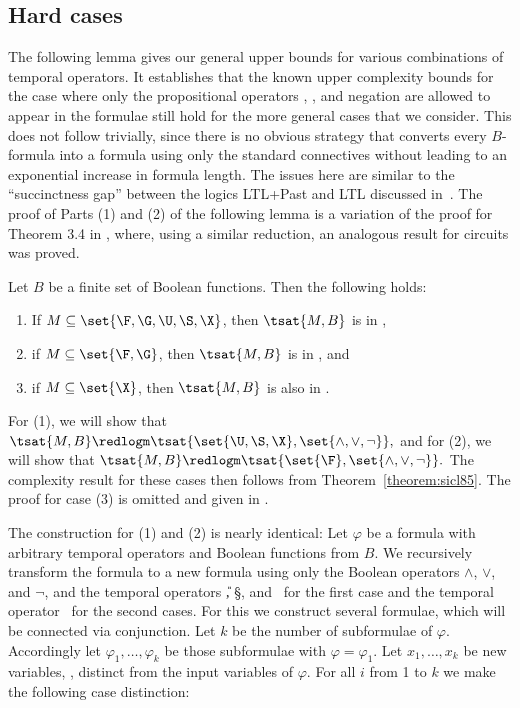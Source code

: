 \subsection{Hard cases}

  The following lemma gives our general upper bounds for various combinations of temporal operators.
It establishes that the known upper complexity bounds for the case
  where only the propositional operators \AND, \OR, and negation are
  allowed to appear in the formulae still hold for the more general
  cases that we consider. This does not follow trivially, since there
  is no obvious strategy that converts every $B$-formula into a
  formula using only the standard connectives without leading to an
  exponential increase in formula length. The issues here are similar
  to the ``succinctness gap'' between the logics LTL+Past and LTL
  discussed in~\cite{mar04}. The proof of Parts (1) and (2) of the
  following lemma is a variation of the proof for Theorem 3.4 in
  \cite{bhss06}, where, using a similar reduction, an analogous result
  for circuits was proved.



  \begin{lemma}\label{lemma:PSPACE_ub_all}
  Let $B$ be a finite set of Boolean functions. Then the following holds:
  \begin{enumerate}[\em(1)]
   \item If $M \subseteq \set{\F,\G,\U,\S,\X}$, then $\tsat{M,B}$ is in \PSPACE,
   \item if $M \subseteq \set{\F,\G}$, then $\tsat{M,B}$ is in \NP, and
   \item if $M \subseteq \set{\X}$, then $\tsat{M,B}$ is also in \NP.
  \end{enumerate}
  \end{lemma}

  \proof For (1), we will show that $\tsat{M,B} \redlogm \tsat{\set{\U,\S,\X},\set{\wedge,\vee,\neg}},$ and
    for (2), we will show that $\tsat{M,B} \redlogm \tsat{\set{\F},\set{\wedge,\vee,\neg}}.$ The complexity result for these cases then follows from Theorem~\ref{theorem:sicl85}.
    \ifreport
    \else
      The proof for case (3) is omitted and given in \cite{bsssv06}.
    \fi

    The construction for (1) and (2) is nearly identical: Let $\varphi$ be a formula with arbitrary temporal operators and Boolean functions from $B$.
    We recursively transform the formula to a new formula using only the Boolean operators $\wedge$, $\vee$, and $\neg$, and the temporal
    operators \U, \S, and \X\ for the first case
    and the temporal operator \F\ for the second case\ifreport s\fi.
    For this we construct several formulae, which will be connected via conjunction. Let $k$ be the number of subformulae of $\varphi$.
Accordingly let $\varphi_1, \dots, \varphi_k$ be those subformulae with $\varphi=\varphi_1$. Let $x_1,\dots,x_k$ be new
    variables, \ie, distinct from the input variables of $\varphi$. For all $i$ from 1 to $k$ we make the following case
    distinction:

